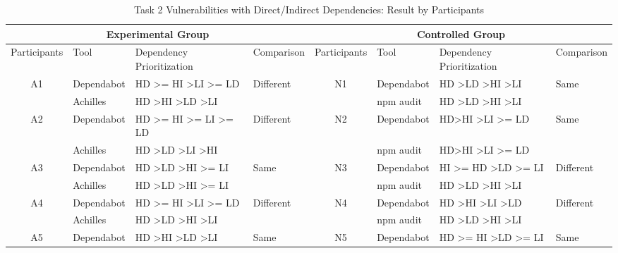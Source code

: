 \documentclass[conference]{IEEEtran}
\begin{document}
	
	\begin{table}[tb]
		\caption{Task 2 Vulnerabilities with Direct/Indirect Dependencies: Result by Participants}
		\centering
		\begin{tabular}{clll|clll}
			\toprule
			\multicolumn{4}{c|}{Experimental Group} & \multicolumn{4}{c}{Controlled Group}  \\ 
			\midrule
			Participants         & Tool       & Dependency Prioritization & Comparison & Participants & Tool  & Dependency Prioritization & Comparison \\ 
			\midrule
			\multirow{2}{*}{A1}  & Dependabot & HD \textgreater{}= HI \textgreater LI \textgreater{}= LD    & \multirow{2}{*}{Different}      & \multirow{2}{*}{N1} & Dependabot & HD \textgreater LD \textgreater HI \textgreater LI  & \multirow{2}{*}{Same} \\ 
			& Achilles   & HD \textgreater HI \textgreater LD \textgreater LI & & & npm audit & HD \textgreater LD \textgreater HI \textgreater LI & \\ 
			\midrule
			\multirow{2}{*}{A2}  & Dependabot & HD \textgreater{}= HI \textgreater{}= LI \textgreater{}= LD & \multirow{2}{*}{Different}      & \multirow{2}{*}{N2} & Dependabot & HD\textgreater HI \textgreater LI \textgreater = LD &  \multirow{2}{*}{Same} \\
			& Achilles   & HD \textgreater LD \textgreater LI \textgreater HI & & & npm audit & HD\textgreater HI \textgreater LI \textgreater = LD &  \\ 
			\midrule
			\multirow{2}{*}{A3}  & Dependabot & HD \textgreater LD \textgreater HI \textgreater{}= LI & \multirow{2}{*}{Same} & \multirow{2}{*}{N3} & Dependabot & HI \textgreater{}= HD \textgreater LD \textgreater{}= LI &  \multirow{2}{*}{Different} \\ 
			& Achilles   & HD \textgreater LD \textgreater HI \textgreater{}= LI & & & npm audit & HD \textgreater LD \textgreater HI \textgreater LI  & \\ 
			\midrule
			\multirow{2}{*}{A4}  & Dependabot & HD \textgreater{}= HI \textgreater LI \textgreater{}= LD    & \multirow{2}{*}{Different}      & \multirow{2}{*}{N4} & Dependabot & HD \textgreater HI \textgreater LI \textgreater LD & \multirow{2}{*}{Different} \\ 
			& Achilles   & HD \textgreater LD \textgreater HI \textgreater LI & & & npm audit &  HD \textgreater LD \textgreater HI \textgreater LI & \\ 
			\midrule
			\multirow{2}{*}{A5}  & Dependabot & HD \textgreater HI \textgreater LD \textgreater LI          & \multirow{2}{*}{Same}           & \multirow{2}{*}{N5} & Dependabot & HD \textgreater{}= HI \textgreater LD \textgreater{}= LI & \multirow{2}{*}{Same} \\ 

\end{tabular}
\end{table}
\end{document}
